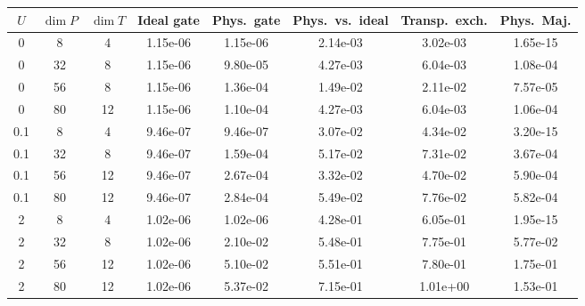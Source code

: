 \begin{tabular}{cccccccc}
\hline
$U$ & $\dim P$ & $\dim T$ & Ideal gate & Phys.\ gate & Phys.\ vs.\ ideal & Transp.\ exch. & Phys.\ Maj. \\
\hline
0 & 8 & 4 & 1.15e-06 & 1.15e-06 & 2.14e-03 & 3.02e-03 & 1.65e-15 \\
0 & 32 & 8 & 1.15e-06 & 9.80e-05 & 4.27e-03 & 6.04e-03 & 1.08e-04 \\
0 & 56 & 8 & 1.15e-06 & 1.36e-04 & 1.49e-02 & 2.11e-02 & 7.57e-05 \\
0 & 80 & 12 & 1.15e-06 & 1.10e-04 & 4.27e-03 & 6.04e-03 & 1.06e-04 \\
\hline
0.1 & 8 & 4 & 9.46e-07 & 9.46e-07 & 3.07e-02 & 4.34e-02 & 3.20e-15 \\
0.1 & 32 & 8 & 9.46e-07 & 1.59e-04 & 5.17e-02 & 7.31e-02 & 3.67e-04 \\
0.1 & 56 & 12 & 9.46e-07 & 2.67e-04 & 3.32e-02 & 4.70e-02 & 5.90e-04 \\
0.1 & 80 & 12 & 9.46e-07 & 2.84e-04 & 5.49e-02 & 7.76e-02 & 5.82e-04 \\
\hline
2 & 8 & 4 & 1.02e-06 & 1.02e-06 & 4.28e-01 & 6.05e-01 & 1.95e-15 \\
2 & 32 & 8 & 1.02e-06 & 2.10e-02 & 5.48e-01 & 7.75e-01 & 5.77e-02 \\
2 & 56 & 12 & 1.02e-06 & 5.10e-02 & 5.51e-01 & 7.80e-01 & 1.75e-01 \\
2 & 80 & 12 & 1.02e-06 & 5.37e-02 & 7.15e-01 & 1.01e+00 & 1.53e-01 \\
\hline
\end{tabular}
